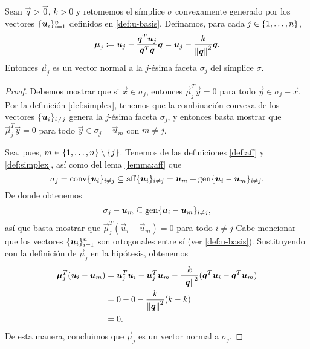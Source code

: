 \begin{lemma}
	\label{mu:orth}
	Sean $\vec{q} > \vec{0}$, $k > 0$ y retomemos el símplice $\sigma$ convexamente generado
	por los vectores $\lbrace \boldsymbol{u}_i \rbrace_{i=1}^{n}$ definidos en
	\eqref{def:u-basis}. Definamos, para cada $j \in \lbrace 1, \ldots, n \rbrace$,
	\begin{equation}
		\label{eq:normal}
		\boldsymbol{\mu}_j \coloneq \boldsymbol{u}_j - \frac{\boldsymbol{q}^T\boldsymbol{u}_j}{\boldsymbol{q}^T\boldsymbol{q}}\boldsymbol{q}
		= \boldsymbol{u}_j - \frac{k}{\left\lVert \boldsymbol{q} \right\rVert^2}\boldsymbol{q}.
	\end{equation}
	Entonces $\vec{\mu}_j$ es un vector normal a la $j$-ésima faceta $\sigma_j$ del símplice
	$\sigma$.
\end{lemma}
\begin{proof}
	Debemos mostrar que si $\vec{x} \in \sigma_j$, entonces
	$\vec{\mu}_j^T\vec{y} = 0$ para todo $\vec{y} \in \sigma_j - \vec{x}$. Por
	la definición \ref{def:simplex}, tenemos que la combinación convexa de  los
	vectores $\lbrace \boldsymbol{u}_i \rbrace_{i \neq j}$ genera la $j$-ésima faceta
	$\sigma_j$, y entonces basta mostrar que $\vec{\mu}_j^T\vec{y} = 0$ para
	todo $\vec{y} \in \sigma_j - \vec{u}_m$ con $m \neq j$.

	Sea, pues, $m \in \lbrace 1, \ldots, n \rbrace \setminus \lbrace j \rbrace$. Tenemos de las definiciones
	\ref{def:aff} y \ref{def:simplex}, así como del lema \ref{lemma:aff} que
	\begin{equation*}
		\sigma_j = \operatorname{conv}\lbrace \boldsymbol{u}_i \rbrace_{i \neq j} \subseteq
		\operatorname{aff}\lbrace \boldsymbol{u}_i \rbrace_{i \neq j}
		= \boldsymbol{u}_m + \operatorname{gen}\lbrace \boldsymbol{u}_i - \boldsymbol{u}_m \rbrace_{i \neq j}.
	\end{equation*}
	De donde obtenemos
	\begin{equation*}
		\sigma_j - \boldsymbol{u}_m \subseteq \operatorname{gen}\lbrace \boldsymbol{u}_i - \boldsymbol{u}_m \rbrace_{i \neq j},
	\end{equation*}
	así que basta mostrar que $\vec{\mu}_j^T(\vec{u}_i - \vec{u}_m) = 0$ para todo $i \neq j$ Cabe
	mencionar que los vectores $\lbrace \boldsymbol{u}_i \rbrace_{i=1}^{n}$ son ortogonales entre sí (ver
	\eqref{def:u-basis}). Sustituyendo con la definición de $\vec{\mu}_j$ en la hipótesis, obtenemos
	\begin{align*}
		\boldsymbol{\mu}_j^T(\boldsymbol{u}_i - \boldsymbol{u}_m)
		&=
		\boldsymbol{u}_j^T\boldsymbol{u}_i - \boldsymbol{u}_j^T\boldsymbol{u}_m - \frac{k}{\left\lVert \boldsymbol{q} \right\rVert^2}(\boldsymbol{q}^T\boldsymbol{u}_i
		- \boldsymbol{q}^T\boldsymbol{u}_m) \\
		&= 0 - 0 -\frac{k}{\left\lVert \boldsymbol{q} \right\rVert^2}(k - k) \\
		&= 0.
	\end{align*}
	De esta manera, concluimos que $\vec{\mu}_j$ es un vector normal a $\sigma_j$.
\end{proof}

